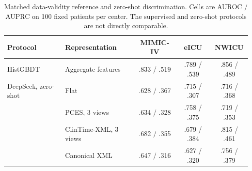 \begin{table}[t]
\caption{Matched data-validity reference and zero-shot discrimination. Cells are AUROC / AUPRC on 100 fixed patients per center. The supervised and zero-shot protocols are not directly comparable.}
\label{tab:zeroshot}
\centering
\small
\begin{tabular}{llccc}
\toprule
Protocol & Representation & MIMIC-IV & eICU & NWICU \\
\midrule
HistGBDT & Aggregate features & .833 / .519 & .789 / .539 & .856 / .489 \\
\midrule
DeepSeek, zero-shot & Flat & .628 / .367 & .715 / .307 & .716 / .368 \\
& PCES, 3 views & .634 / .328 & .758 / .375 & .719 / .353 \\
& ClinTime-XML, 3 views & .682 / .355 & .679 / .384 & .815 / .461 \\
& Canonical XML & .647 / .316 & .627 / .320 & .756 / .379 \\
\bottomrule
\end{tabular}
\end{table}
